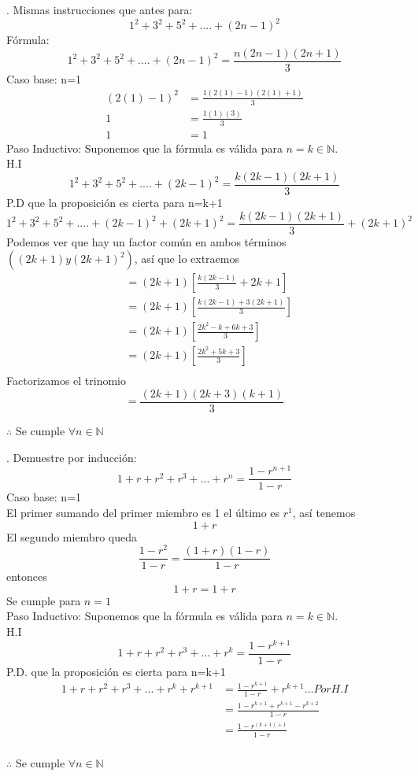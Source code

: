\documentclass[letterpaper]{article}
\renewcommand{\*}{\cdot}
\theoremstyle{definition}
\begin{document}
.	Mismas instrucciones que antes para:
$$1^2+3^2+5^2+....+(2n-1)^2$$
Fórmula:
$$1^2+3^2+5^2+....+(2n-1)^2 = \frac{n(2n-1)(2n+1)}{3}$$
Caso base: n=1
\begin{align*}
	(2(1)-1)^2&=\frac{1(2(1)-1)(2(1)+1)}{3}\\
	1&=\frac{1(1)(3)}{3}\\
	1&=1
\end{align*}
Paso Inductivo: Suponemos que la fórmula es válida para $n=k \in \mathbb{N}.$\\
H.I
$$1^2+3^2+5^2+....+(2k-1)^2 = \frac{k(2k-1)(2k+1)}{3}$$
P.D que la proposición es cierta para n=k+1
$$1^2+3^2+5^2+....+(2k-1)^2+(2k+1)^2= \frac{k(2k-1)(2k+1)}{3}+(2k+1)^2$$
Podemos ver que hay un factor común en ambos términos $((2k+1) y (2k+1)^2)$, así que lo extraemos
\begin{align*}
	&=(2k+1)[\frac{k(2k-1)}{3}+2k+1]\\
	&=(2k+1)[\frac{k(2k-1)+3(2k+1)}{3}]\\
	&=(2k+1)[\frac{2k^2-k+6k+3}{3}]\\
	&=(2k+1)[\frac{2k^2+5k+3}{3}]\\
\end{align*}
Factorizamos el trinomio
$$=\frac{(2k+1)(2k+3)(k+1)}{3}$$
\begin{center}
	$\therefore$ Se cumple $\forall{n} \in \mathbb{N}$\\
\end{center}

. Demuestre por inducción:
$$1+r+r^2+r^3+...+r^n=\frac{1-r^{n+1}}{1-r}$$
Caso base: n=1\\
El primer sumando del primer miembro es 1 el último es $r^1$, así tenemos\\
$$1+r$$ 
El segundo miembro queda $$\frac{1-r^2}{1-r}=\frac{(1+r)(1-r)}{1-r}$$
entonces $$1+r=1+r$$ 
Se cumple para $n=1$\\

Paso Inductivo: Suponemos que la fórmula es válida para $n=k \in \mathbb{N}.$\\
H.I
$$1+r+r^2+r^3+...+r^k=\frac{1-r^{k+1}}{1-r}$$
P.D. que la proposición es cierta para n=k+1
\begin{align*}
	1+r+r^2+r^3+...+r^k+r^{k+1}&=\frac{1-r^{k+1}}{1-r}+r^{k+1}...Por H.I\\
	&=\frac{1-r^{k+1}+r^{k+1}-r^{k+2}}{1-r}\\
	&=\frac{1-r^{(k+1)+1}}{1-r}\\
\end{align*}
\begin{center}
	$\therefore$ Se  cumple  $\forall{n} \in \mathbb{N}$\\
\end{center}
\end{document}
